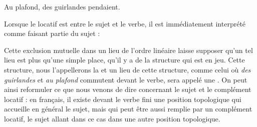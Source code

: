 \ea Au plafond, des guirlandes pendaient. \z

Lorsque le locatif est entre le sujet et le verbe, il est immédiatement interprété comme faisant partie du sujet :

\z

Cette exclusion mutuelle dans un lieu de l’ordre linéaire laisse supposer qu’un tel lieu est plus qu’une simple place, qu’il y a de la structure qui est en jeu. Cette structure, nous l’appellerons la  et un lieu de cette structure, comme celui où \textit{des guirlandes} et \textit{au plafond} commutent devant le verbe, sera appelé une . On peut ainsi reformuler ce que nous venons de dire concernant le sujet et le complément locatif : en français, il existe devant le verbe fini une position topologique qui accueille en général le sujet, mais qui peut être aussi remplie par un complément locatif, le sujet allant dans ce cas dans une autre position topologique.

